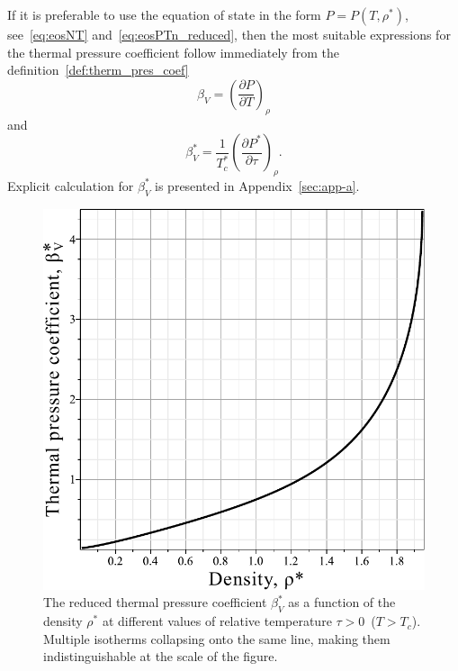 If it is preferable to use the equation of state in the form $P=P(T, \rho^*)$, see~\eqref{eq:eosNT} and~\eqref{eq:eosPTn_reduced}, then the most suitable expressions for the thermal pressure coefficient follow immediately from the definition~\eqref{def:therm_pres_coef}
\begin{equation}
	\beta_V = \left(\frac{\partial P}{\partial T}\right)_\rho
\end{equation}
and
\begin{equation}
	\label{eq:beta_star_n}
	\beta^*_V = \frac{1}{T^*_c} \left(\frac{\partial P^*}{\partial \tau}\right)_{\rho}.
\end{equation}
Explicit calculation for $\beta^*_V$ is presented in Appendix~\ref{sec:app-a}.

\begin{figure}[h!] 
	\includegraphics[width=\column]{f3a.pdf}
	\vskip-3mm
	\caption{The reduced thermal pressure coefficient $\beta^*_V$ as a function of the density $\rho^*$ at different values of relative temperature $\tau > 0$~($T > T_c$). Multiple isotherms collapsing onto the same line, making them indistinguishable at the scale of the figure.
	}
	\label{fig3a}
\end{figure}
